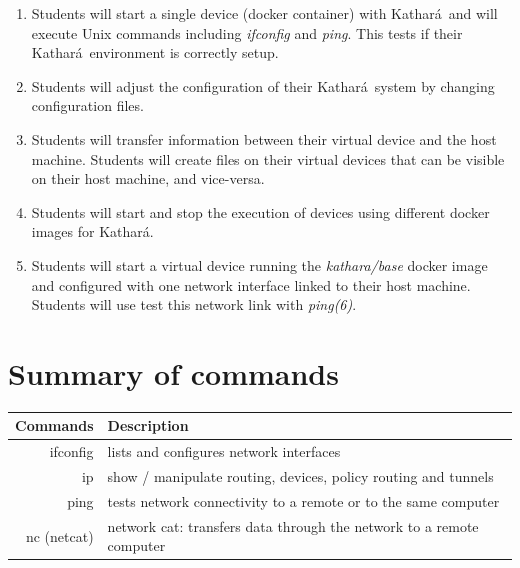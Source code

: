 \documentclass[12pt]{book}
\newcommand{\kathara}{Kathar\'a}
\begin{document}
\begin{enumerate}[label=\arabic*.]
\begin{enumerate}[label=Objective \arabic*]
  \item\label{vstart} Students will start a single device (docker container) with \kathara\ and will execute Unix commands including \emph{ifconfig} and \emph{ping}. This tests if their \kathara\ environment is correctly setup.
  \item\label{config} Students will adjust the configuration of their \kathara\ system by changing configuration files.
  \item \label{hosthome.rf} Students will transfer information between their virtual device and the host machine. Students will create files on their virtual devices that can be visible on their host machine, and vice-versa.
  \item \label{image.rf} Students will start and stop the execution of devices using different docker images for \kathara.
  \item\label{bridged} Students will start a virtual device running the \emph{kathara/base} docker image and configured with one network interface linked to their host machine. Students will use test this network link with \emph{ping(6)}. 
\end{enumerate}


\section{Summary of commands}

\begin{tabularx}{\textwidth}{r  X}
  Commands & Description \\ \midrule
  ifconfig & lists and configures network interfaces \\
  ip & show / manipulate routing, devices, policy routing and tunnels \\
  ping & tests network connectivity to a remote or to the same computer \\
  nc (netcat) & network cat: transfers data through the network to a remote computer \\ \midrule


\end{tabularx}
\end{enumerate}
\end{document}
